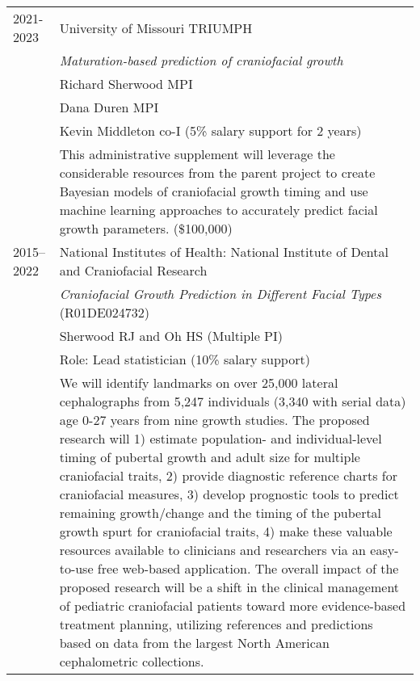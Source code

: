 \begin{longtable}{@{}lX@{}}
    2021-2023 & University of Missouri TRIUMPH\\
    & \emph{Maturation-based prediction of craniofacial growth}\\
    & Richard Sherwood MPI\\
    & Dana Duren MPI\\
    & Kevin Middleton co-I (5\% salary support for 2 years)\\
    & This administrative supplement will leverage the considerable resources from the parent project to create Bayesian models of craniofacial growth timing and use machine learning approaches to accurately predict facial growth parameters. (\$100,000)\\[0.5pc]
         
    2015--2022 & National Institutes of Health: National Institute of Dental and Craniofacial Research\\
    & \emph{Craniofacial Growth Prediction in Different Facial Types} (R01DE024732)\\
    & Sherwood RJ and Oh HS (Multiple PI)\\
    & Role: Lead statistician (10\% salary support)\\
    & We will identify landmarks on over 25,000 lateral cephalographs from 5,247 individuals (3,340 with serial data) age 0-27 years from nine growth studies. The proposed research will 1) estimate population- and individual-level timing of pubertal growth and adult size for multiple craniofacial traits, 2) provide diagnostic reference charts for craniofacial measures, 3) develop prognostic tools to predict remaining growth/change and the timing of the pubertal growth spurt for craniofacial traits, 4) make these valuable resources available to clinicians and researchers via an easy-to-use free web-based application. The overall impact of the proposed research will be a shift in the clinical management of pediatric craniofacial patients toward more evidence-based treatment planning, utilizing references and predictions based on data from the largest North American cephalometric collections.\\[0.5pc]

\end{longtable}
